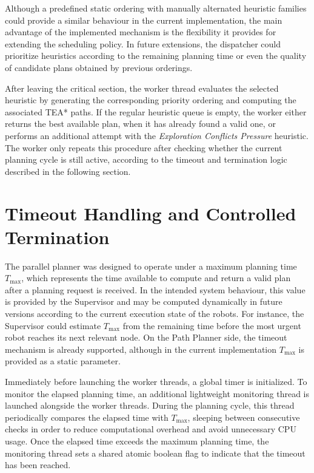 Although a predefined static ordering with manually alternated heuristic families could provide a
similar behaviour in the current implementation, the main advantage of the implemented mechanism
is the flexibility it provides for extending the scheduling policy. In future extensions, the dispatcher
could prioritize heuristics according to the remaining planning time or even the quality of candidate
plans obtained by previous orderings.

After leaving the critical section, the worker thread evaluates the selected heuristic by generating
the corresponding priority ordering and computing the associated TEA* paths. If the regular
heuristic queue is empty, the worker either returns the best available plan, when it has already
found a valid one, or performs an additional attempt with the \textit{Exploration Conflicts Pressure}
heuristic. The worker only repeats this procedure after checking whether the current planning cycle
is still active, according to the timeout and termination logic described in the following section.


\section{Timeout Handling and Controlled Termination}
\label{sec:timeout_controlled_termination}
\hspace{\parindent}
The parallel planner was designed to operate under a maximum planning time \(T_{\max}\), which
represents the time available to compute and return a valid plan after a planning request is received.
In the intended system behaviour, this value is provided by the Supervisor and may be computed
dynamically in future versions according to the current execution state of the robots. For instance,
the Supervisor could estimate \(T_{\max}\) from the remaining time before the most urgent robot
reaches its next relevant node. On the Path Planner side, the timeout mechanism is already
supported, although in the current implementation \(T_{\max}\) is provided as a static parameter.

Immediately before launching the worker threads, a global timer is initialized. To monitor the
elapsed planning time, an additional lightweight monitoring thread is launched alongside the worker
threads. During the planning cycle, this thread periodically compares the elapsed time with
\(T_{\max}\), sleeping between consecutive checks in order to reduce computational overhead and
avoid unnecessary CPU usage. Once the elapsed time exceeds the maximum planning time, the
monitoring thread sets a shared atomic boolean flag to indicate that the timeout has been reached.

